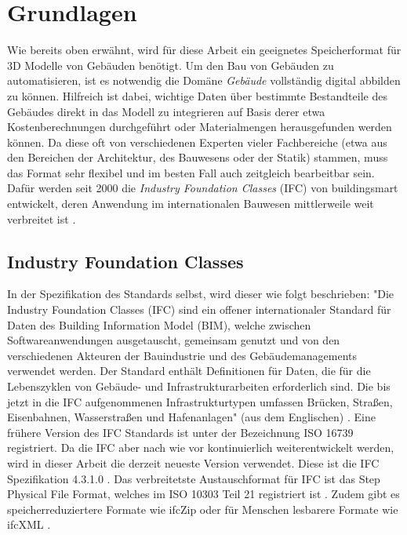 \chapter{Grundlagen} \label{basics}
Wie bereits oben erwähnt, wird für diese Arbeit ein geeignetes Speicherformat für 3D Modelle von Gebäuden benötigt.
Um den Bau von Gebäuden zu automatisieren, ist es notwendig die Domäne \textit{Gebäude} vollständig digital abbilden zu können. 
Hilfreich ist dabei, wichtige Daten über bestimmte Bestandteile des Gebäudes direkt in das Modell zu integrieren auf Basis derer etwa Kostenberechnungen durchgeführt oder Materialmengen herausgefunden werden können.
Da diese oft von verschiedenen Experten vieler Fachbereiche (etwa aus den Bereichen der Architektur, des Bauwesens oder der Statik) stammen, muss das Format sehr flexibel und im besten Fall auch zeitgleich bearbeitbar sein.
Dafür werden seit 2000 die \textit{Industry Foundation Classes} (IFC) von buildingsmart entwickelt, deren Anwendung im internationalen Bauwesen mittlerweile weit verbreitet ist \cite{Industry61:online}.


\section{Industry Foundation Classes}
\label{basics:ifc}
In der Spezifikation des Standards selbst, wird dieser wie folgt beschrieben:
"Die Industry Foundation Classes (IFC) sind ein offener internationaler Standard für Daten des Building Information Model (BIM), welche zwischen Softwareanwendungen ausgetauscht, gemeinsam genutzt und von den verschiedenen Akteuren der Bauindustrie und des Gebäudemanagements verwendet werden. 
Der Standard enthält Definitionen für Daten, die für die Lebenszyklen von Gebäude- und Infrastrukturarbeiten erforderlich sind. 
Die bis jetzt in die IFC aufgenommenen Infrastrukturtypen umfassen Brücken, Straßen, Eisenbahnen, Wasserstraßen und Hafenanlagen" (aus dem Englischen) \cite{IFCScope:online}. 
Eine frühere Version des IFC Standards ist unter der Bezeichnung ISO 16739\cite{ISOISO1694:online} registriert.
Da die IFC aber nach wie vor kontinuierlich weiterentwickelt werden, wird in dieser Arbeit die derzeit neueste Version verwendet.
Diese ist die IFC Spezifikation 4.3.1.0 \cite{IFC4310Spezification:online}.
Das verbreitetste Austauschformat für IFC ist das Step Physical File Format, welches im ISO 10303 Teil 21 registriert ist \cite{ISO_Step:online}.
Zudem gibt es speicherreduziertere Formate wie ifcZip oder für Menschen lesbarere Formate wie ifcXML \cite{Industry93:online} \cite{IFCForma28:online}.

